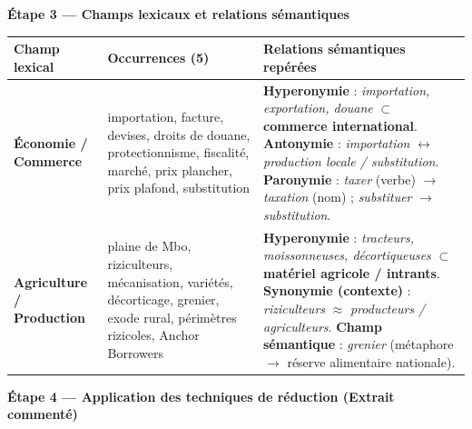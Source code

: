 \documentclass[11pt]{article}
\begin{document}
\begin{exoresolu}
\textbf{Étape 3 — Champs lexicaux et relations sémantiques}

\begin{center}
\begin{tabularx}{\linewidth}{|l|X|X|}\hline
\rowcolor{popblueL}
\textbf{Champ lexical} & \textbf{Occurrences (5)} & \textbf{Relations sémantiques repérées} \\ \hline
\cellcolor{popgreenL}\textbf{Économie / Commerce} & importation, facture, devises, droits de douane, protectionnisme, fiscalité, marché, prix plancher, prix plafond, substitution & \textbf{Hyperonymie} : \emph{importation, exportation, douane} $\subset$ \textbf{commerce international}. \textbf{Antonymie} : \emph{importation} $\leftrightarrow$ \emph{production locale / substitution}. \textbf{Paronymie} : \emph{taxer} (verbe) $\to$ \emph{taxation} (nom) ; \emph{substituer} $\to$ \emph{substitution}. \\ \hline
\cellcolor{poporangeL}\textbf{Agriculture / Production} & plaine de Mbo, riziculteurs, mécanisation, variétés, décorticage, grenier, exode rural, périmètres rizicoles, Anchor Borrowers & \textbf{Hyperonymie} : \emph{tracteurs, moissonneuses, décortiqueuses} $\subset$ \textbf{matériel agricole / intrants}. \textbf{Synonymie (contexte)} : \emph{riziculteurs} $\approx$ \emph{producteurs / agriculteurs}. \textbf{Champ sémantique} : \emph{grenier} (métaphore $\to$ réserve alimentaire nationale). \\ \hline
\end{tabularx}
\end{center}

\textbf{Étape 4 — Application des techniques de réduction (Extrait commenté)}


\end{exoresolu}
\end{document}
